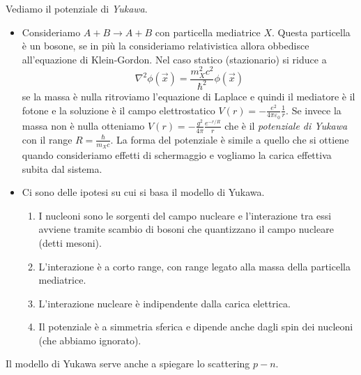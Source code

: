 Vediamo il potenziale di \textit{Yukawa}.
\begin{itemize}
    \item Consideriamo $A+B\to A+B$ con particella mediatrice $X$. Questa particella è un bosone, se in più la consideriamo relativistica allora obbedisce all'equazione di Klein-Gordon. Nel caso statico (stazionario) si riduce a
    \begin{equation*}
        \nabla^2\phi(\vec x)=\frac{m_X^2c^2}{\hbar^2}\phi(\vec x)
    \end{equation*}
    se la massa è nulla ritroviamo l'equazione di Laplace e quindi il mediatore è il fotone e la soluzione è il campo elettrostatico $V(r)=-\frac{e^2}{4\pi\varepsilon_0}\frac1r$. Se invece la massa non è nulla otteniamo $V(r)=-\frac{g^2}{4\pi}\frac{e^{-r/R}}{r}$ che è il \textit{potenziale di Yukawa} con il range $R=\frac{\hbar}{m_Xc}$. La forma del potenziale è simile a quello che si ottiene quando consideriamo effetti di schermaggio e vogliamo la carica effettiva subita dal sistema.
    \item Ci sono delle ipotesi su cui si basa il modello di Yukawa.
    \begin{enumerate}
        \item I nucleoni sono le sorgenti del campo nucleare e l'interazione tra essi avviene tramite scambio di bosoni che quantizzano il campo nucleare (detti mesoni).
        \item L'interazione è a corto range, con range legato alla massa della particella mediatrice.
        \item L'interazione nucleare è indipendente dalla carica elettrica.
        \item Il potenziale è a simmetria sferica e dipende anche dagli spin dei nucleoni (che abbiamo ignorato).
    \end{enumerate}
\end{itemize}
Il modello di Yukawa serve anche a spiegare lo scattering $p-n$.

